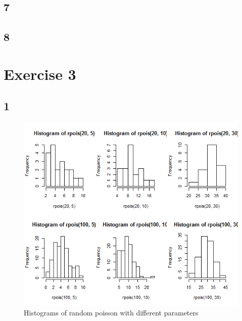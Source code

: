 \documentclass{article}
\begin{document}
    \subsection*{7}
    
    \subsection*{8}

  \section*{Exercise 3}
    \subsection*{1}
      \begin{figure}[H]
          \centering
          \includegraphics[scale=0.3]{../results/3_1.png}
          \caption{Histograms of random poisson with different parameters}
          \label{fig:Hist3_1}
      \end{figure}
\end{document}
